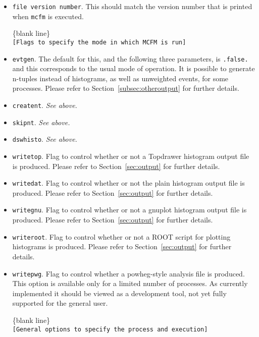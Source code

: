 \documentclass[12pt]{article}
\begin{document}
\begin{itemize}
\item {\tt file version number}. This should match the version number
that is printed when {\tt mcfm} is executed.

\begin{center}
\{blank line\} \\
{\tt [Flags to specify the mode in which MCFM is run] }
\end{center}

\item {\tt evtgen}. The default for this, and the following three
parameters, is {\tt .false.} and this corresponds to the usual mode
of operation. It is possible to generate n-tuples instead of histograms,
as well as unweighted events, for some processes. Please refer to
Section~\ref{subsec:otheroutput} for further details.
\item {\tt creatent}. {\it See above.}
\item {\tt skipnt}. {\it See above.}
\item {\tt dswhisto}. {\it See above.}
\item {\tt writetop}. Flag to control whether or not a Topdrawer histogram output file
is produced. Please refer to Section~\ref{sec:output} for further details.
\item {\tt writedat}. Flag to control whether or not the plain histogram output file
is produced. Please refer to Section~\ref{sec:output} for further details.
\item {\tt writegnu}. Flag to control whether or not a gnuplot histogram output file
is produced. Please refer to Section~\ref{sec:output} for further details.
\item {\tt writeroot}. Flag to control whether or not a ROOT script for plotting
histograms is produced. Please refer to Section~\ref{sec:output} for further details.
\item {\tt writepwg}. Flag to control whether a powheg-style analysis file is produced.
This option is available only for a limited number of processes. As currently implemented it
should be viewed as a development tool, not yet fully supported for the general user.

\begin{center}
\{blank line\} \\
{\tt [General options to specify the process and execution] }
\end{center}


\end{itemize}
\end{document}
